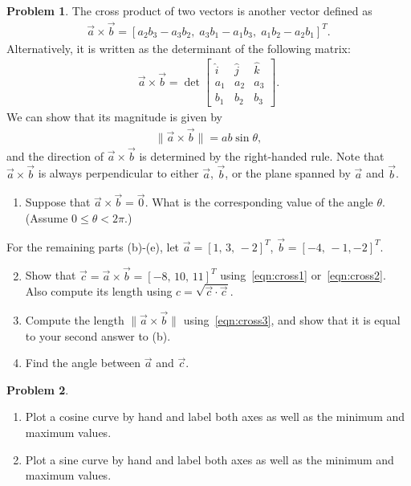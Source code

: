 \documentclass[10pt]{article}
\theoremstyle{definition}
\newtheorem{prob}{Problem}[section]
\newenvironment{subprob}%
{\renewcommand{\theenumi}{\alph{enumi}}\renewcommand{\labelenumi}{(\theenumi)}\begin{enumerate}}%
{\end{enumerate}}%
\begin{document}
\begin{prob}
The cross product of two vectors is another vector defined as
\begin{align}
\vec a \times \vec b = [a_2b_3-a_3b_2,\; a_3b_1-a_1b_3,\; a_1b_2-a_2b_1]^T.\label{eqn:cross1}
\end{align}
Alternatively, it is written as the determinant of the following matrix:
\begin{align}
\vec a \times \vec b = \det
\begin{bmatrix}
\hat i & \hat j & \hat k\\
a_1 & a_2 & a_3\\
b_1 & b_2 & b_3
\end{bmatrix}.\label{eqn:cross2}
\end{align}
We can show that its magnitude is given by
\begin{align}
\| \vec a \times \vec b \| = a b \sin\theta,\label{eqn:cross3}
\end{align}
and the direction of $\vec a \times \vec b$ is determined by the right-handed rule. Note that $\vec a\times \vec b$ is always perpendicular to either $\vec a$, $\vec b$, or the plane spanned by $\vec a$ and $\vec b$.

\begin{subprob}
\item Suppose that $\vec a \times \vec b = \vec 0$. What is the corresponding value of the angle $\theta$. (Assume $0\leq\theta < 2 \pi$.)
\end{subprob}
For the remaining parts (b)-(e), let $\vec a = [1,\,3,\,-2]^T$, $\vec b =[-4,\,-1,-2]^T$. 
\begin{subprob}\setcounter{enumi}{1}
\item Show that $\vec c = \vec a \times \vec b=[-8,\,10,\,11]^T$ using~\cref{eqn:cross1} or~\cref{eqn:cross2}. Also compute its length using $c = \sqrt{\vec c \cdot \vec c}$.
\item Compute the length $\| \vec a \times \vec b \|$ using~\cref{eqn:cross3}, and show that it is equal to your second answer to (b).
\item Find the angle between $\vec a$ and $\vec c$. 
\end{subprob}
\end{prob}

\begin{prob}
    \hfill
    \begin{subprob}
    \item Plot a cosine curve by hand and label both axes as well as the minimum and maximum values.
    \item Plot a sine curve by hand and label both axes as well as the minimum and maximum values.
    \end{subprob}
\end{prob}
\end{document}
